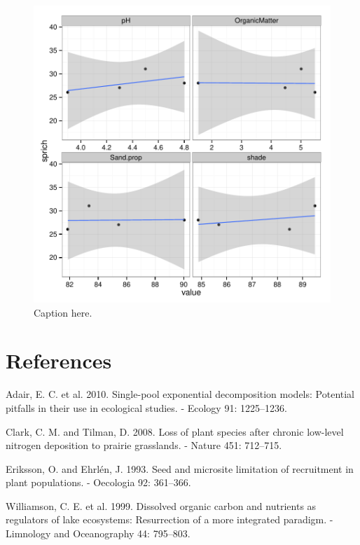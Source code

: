 \documentclass[12pt]{article} %
\makeatletter
\def\maxwidth{\ifdim\Gin@nat@width>\linewidth\linewidth
	\else\Gin@nat@width\fi}
\let\Oldincludegraphics\includegraphics
\renewcommand{\includegraphics}[1]{\Oldincludegraphics[width=\maxwidth]{#1}}
\makeatother
\begin{document}
\clearpage

\begin{figure}[htbp]
\centering
\includegraphics{Figs/plot.pdf}
\caption{Caption here.\label{f:plot}}
\end{figure}

\clearpage

\section*{References}\label{references}

Adair, E. C. et al. 2010. Single-pool exponential decomposition models:
Potential pitfalls in their use in ecological studies. - Ecology 91:
1225--1236.

Clark, C. M. and Tilman, D. 2008. Loss of plant species after chronic
low-level nitrogen deposition to prairie grasslands. - Nature 451:
712--715.

Eriksson, O. and Ehrlén, J. 1993. Seed and microsite limitation of
recruitment in plant populations. - Oecologia 92: 361--366.

Williamson, C. E. et al. 1999. Dissolved organic carbon and nutrients as
regulators of lake ecosystems: Resurrection of a more integrated
paradigm. - Limnology and Oceanography 44: 795--803.

%
\end{document}
